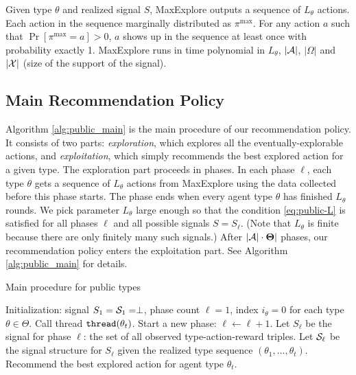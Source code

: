 \begin{claim}
\label{clm:maxexplore}
Given type $\theta$ and realized signal $S$, MaxExplore outputs a sequence of $L_{\theta}$ actions.
Each action in the sequence marginally distributed as $\pi^{\max}$.
For any action $a$ such that $\Pr[\pi^{\max} =a] >0$, $a$ shows up in the sequence at least once with probability exactly 1.
MaxExplore runs in time polynomial in $L_{\theta}$, $|\A|$, $|\varOmega|$ and $|\X|$ (size of the support of the signal).
\end{claim}

\subsection{Main Recommendation Policy}
\label{sec:public_main}

Algorithm \ref{alg:public_main} is the main procedure of our recommendation policy. It consists of two parts: \emph{exploration}, which explores all the eventually-explorable actions, and \emph{exploitation}, which simply recommends the best explored action for a given type. The exploration part proceeds in phases. In each phase $\ell$, each type $\theta$ gets a sequence of $L_{\theta}$ actions from MaxExplore using the data collected before this phase starts. The phase ends when every agent type $\theta$ has finished $L_{\theta}$ rounds. We pick parameter $L_{\theta}$ large enough so that the condition
\eqref{eq:public-L} is satisfied for all phases $\ell$ and all possible signals $S=S_\ell$. (Note that $L_{\theta}$ is finite because there are only finitely many such signals.)
  After $|\A| \cdot \varTheta|$ phases, our recommendation policy enters the exploitation part. See Algorithm \ref{alg:public_main} for  details.

 \begin{algorithm}[t]
    \caption{Main procedure for public types }
    	\label{alg:public_main}
    \begin{algorithmic}[1]
    \STATE Initialization: signal $S_1 = \S_1 = \perp$,
             phase count $\ell = 1$, index $i_{\theta} = 0$ for each type $\theta \in \varTheta$.
		\IF {$\ell \leq |\A|\cdot |\varTheta|$}
		 \STATE {}
		Call thread $\thread(\theta_t)$.
				\STATE Start a new phase: $\ell \leftarrow \ell + 1$.
				\STATE Let $S_\ell$ be the signal for phase $\ell$: 
                 the set of all observed type-action-reward triples.
        \STATE Let $\S_\ell$ be the signal structure for $S_\ell$ given the realized type sequence $(\theta_1,...,\theta_t)$.
			\ENDIF
		\ELSE
			\STATE {}
			Recommend the best explored action for agent type $\theta_t$.
		\ENDIF
	\ENDFOR
     \end{algorithmic}
\end{algorithm}

